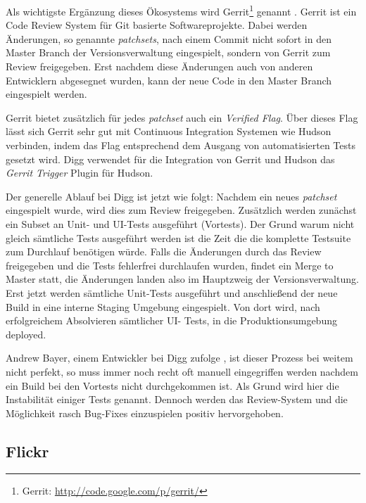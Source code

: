 Als wichtigste Ergänzung dieses Ökosystems wird Gerrit\footnote{Gerrit:
\url{http://code.google.com/p/gerrit/}} genannt \cite{digg4}. Gerrit ist ein
Code Review System für Git basierte Softwareprojekte. Dabei werden Änderungen,
so genannte \emph{patchsets}, nach einem Commit nicht sofort in den Master
Branch der Versionsverwaltung eingespielt, sondern von Gerrit zum Review
freigegeben. Erst nachdem diese Änderungen auch von anderen Entwicklern
abgesegnet wurden, kann der neue Code in den Master Branch eingespielt werden.

Gerrit bietet zusätzlich für jedes \emph{patchset} auch ein \emph{Verified
Flag}. Über dieses Flag lässt sich Gerrit sehr gut mit Continuous Integration
Systemen wie Hudson verbinden, indem das Flag entsprechend dem Ausgang von
automatisierten Tests gesetzt wird. Digg verwendet für die Integration von
Gerrit und Hudson das \emph{Gerrit Trigger} Plugin für Hudson.

Der generelle Ablauf bei Digg ist jetzt wie folgt: Nachdem ein neues
\emph{patchset} eingespielt wurde, wird dies zum Review freigegeben.
Zusätzlich werden zunächst ein Subset an Unit- und UI-Tests ausgeführt
(Vortests). Der Grund warum nicht gleich sämtliche Tests ausgeführt werden ist
die Zeit die die komplette Testsuite zum Durchlauf benötigen würde. Falls die
Änderungen durch das Review freigegeben und die Tests fehlerfrei durchlaufen
wurden, findet ein Merge to Master statt, die Änderungen landen also im
Hauptzweig der Versionsverwaltung. Erst jetzt werden sämtliche Unit-Tests
ausgeführt und anschließend der neue Build in eine interne Staging Umgebung
eingespielt. Von dort wird, nach erfolgreichem Absolvieren sämtlicher UI-
Tests, in die Produktionsumgebung deployed.

Andrew Bayer, einem Entwickler bei Digg zufolge \cite{digg4}, ist dieser
Prozess bei weitem nicht perfekt, so muss immer noch recht oft manuell
eingegriffen werden nachdem ein Build bei den Vortests nicht durchgekommen
ist. Als Grund wird hier die Instabilität einiger Tests genannt. Dennoch
werden das Review-System und die Möglichkeit rasch Bug-Fixes einzuspielen
positiv hervorgehoben.


\subsection{Flickr}

